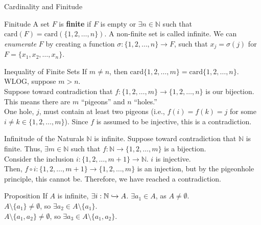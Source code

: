 \documentclass[8pt]{extarticle}
\begin{document}
\begin{problem}{Cardinality and Finitude}
    \begin{problem}{Finitude}
      A set $F$ is \textbf{finite} if $F$ is empty or $\exists n\in \mathbb{N}$ such that $\textrm{card}(F) = \textrm{card}\left(\{1,2,\dots,n\}\right)$. A non-finite set is called infinite.
      \tcblower
      We can \textit{enumerate} $F$ by creating a function $\sigma: \{1,2,\dots,n\}\rightarrow F$, such that $x_j = \sigma(j)$ for $F = \{x_1,x_2,\dots,x_n\}$.
    \end{problem}
    \begin{problem}{Inequality of Finite Sets}
      If $m\neq n$, then $\textrm{card}\{1,2,\dots,m\} = \textrm{card}\{1,2,\dots,n\}$.
      \tcblower
      WLOG, suppose $m>n$.\\

      Suppose toward contradiction that $f: \{1,2,\dots,m\} \rightarrow \{1,2,\dots,n\}$ is our bijection. This means there are $m$ ``pigeons'' and $n$ ``holes.''\\

      One hole, $j$, must contain at least two pigeons (i.e., $f(i) = f(k) = j$ for some $i\neq k\in \{1,2,\dots,m\}$). Since $f$ is assumed to be injective, this is a contradiction.
    \end{problem}
    \begin{problem}{Infinitude of the Naturals}
      $\mathbb{N}$ is infinite.
      \tcblower
      Suppose toward contradiction that $\mathbb{N}$ is finite. Thus, $\exists m\in \mathbb{N}$ such that $f:\mathbb{N} \rightarrow \{1,2,\dots,m\}$ is a bijection.\\

      Consider the inclusion $i: \{1,2,\dots,m+1\}\rightarrow \mathbb{N}$. $i$ is injective.\\

      Then, $f\circ i: \{1,2,\dots,m+1\} \rightarrow \{1,2,\dots,m\}$ is an injection, but by the pigeonhole principle, this cannot be. Therefore, we have reached a contradiction.
    \end{problem}
    \begin{problem}{Proposition}
      If $A$ is infinite, $\exists i: \mathbb{N} \xhookrightarrow{} A$.
      \tcblower
      $\exists a_1\in A$, as $A\neq \emptyset$.\\

      $A\setminus \{a_1\} \neq \emptyset$, so $\exists a_2 \in A\setminus \{a_1\}$.\\

      $A \setminus \{a_1,a_2\} \neq \emptyset$, so $\exists a_3\in A\setminus \{a_1,a_2\}$.\\


\end{problem}
\end{problem}
\end{document}
